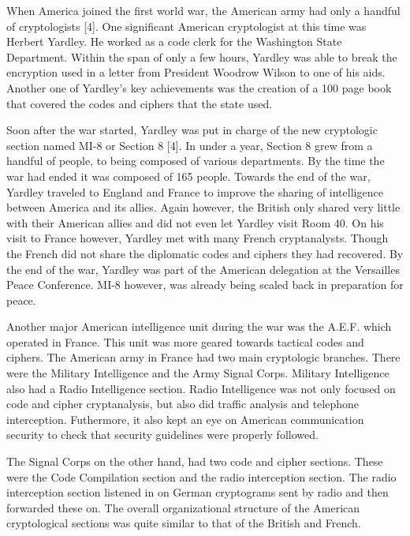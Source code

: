 \documentclass{article}
\begin{document}
    When America joined the first world war, the American army had only a handful of
    cryptologists [4].
    One significant American cryptologist at this time was Herbert Yardley.
    He worked as a code clerk for the Washington State Department.
    Within the span of only a few hours, Yardley was able to break the encryption
    used in a letter from President Woodrow Wilson to one of his aids.
    Another one of Yardley's key achievements was the creation of a 100 page book
    that covered the codes and ciphers that the state used.

    Soon after the war started, Yardley was put in charge of the new cryptologic section
    named MI-8 or Section 8 [4]. In under a year, Section 8 grew from a handful of people,
    to being composed of various departments. By the time the war had ended
    it was composed of 165 people.
    Towards the end of the war, Yardley traveled to England and France to improve
    the sharing of intelligence between America and its allies.
    Again however, the British only shared very little with their American allies and did
    not even let Yardley visit Room 40.
    On his visit to France however, Yardley met with many French cryptanalysts.
    Though the French did not share the diplomatic codes and ciphers they had recovered.
    By the end of the war, Yardley was part of the American delegation at
    the Versailles Peace Conference. MI-8 however, was already being scaled back
    in preparation for peace.

    Another major American intelligence unit during the war was the A.E.F. which
    operated in France. This unit was more geared towards tactical codes and ciphers.
    The American army in France had two main cryptologic branches.
    There were the Military Intelligence and the Army Signal Corps.
    Military Intelligence also had a Radio Intelligence section. Radio Intelligence
    was not only focused on code and cipher cryptanalysis, but also did traffic
    analysis and telephone interception. Futhermore, it also kept an eye on American
    communication security to check that security guidelines were properly followed.

    The Signal Corps on the other hand, had two code and cipher sections. These
    were the Code Compilation section and the radio interception section.
    The radio interception section listened in on German cryptograms sent by radio
    and then forwarded these on.
    The overall organizational structure of the American cryptological sections
    was quite similar to that of the British and French.
\end{document}
